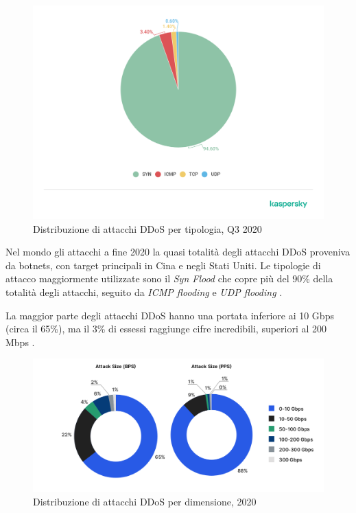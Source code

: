 \begin{figure}[h]
    \includegraphics[width=\hsize]{images/introduzione/07-en-ddos-report-q3-2020-chrarts.png}
    \caption{Distribuzione di attacchi DDoS per tipologia, Q3 2020 \cite{ddos_kaspersky_q3_2020}}
    \centering
\end{figure}

Nel mondo gli attacchi a fine 2020 la quasi totalità degli attacchi DDoS proveniva da botnets, con target principali in Cina e negli Stati Uniti. Le tipologie di attacco maggiormente utilizzate sono il \emph{Syn Flood} che copre più del 90\% della totalità degli attacchi, seguito da \emph{ICMP flooding} e \emph{UDP flooding} \cite{ddos_kaspersky, ddos_kaspersky_q3_2020}.


La maggior parte degli attacchi DDoS hanno una portata inferiore ai 10 Gbps (circa il 65\%), ma il 3\% di essessi raggiunge cifre incredibili, superiori al 200 Mbps \cite{imperva_ddos_report}.

\begin{figure}[h]
    \includegraphics[width=\hsize]{images/introduzione/attacks_size.png}
    \caption{Distribuzione di attacchi DDoS per dimensione, 2020 \cite{imperva_ddos_report}}
    \centering
\end{figure}



